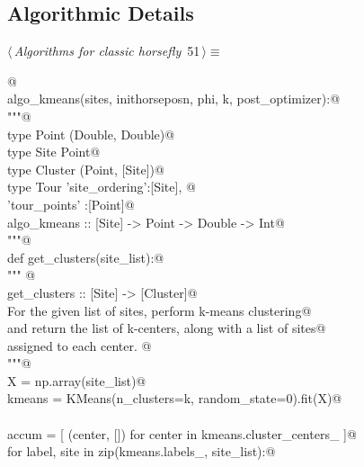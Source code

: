 \documentclass[11.5pt]{report}
\begin{document}
\subsection{Algorithmic Details}
\newchunk
\begin{flushleft} \small\label{scrap79}\raggedright\small
{} $\langle\,${\itshape Algorithms for classic horsefly}\nobreak\ {\footnotesize {51}}$\,\rangle\equiv$
\vspace{-1ex}
\begin{list}{}{} \item
\mbox{}\verb@   @\\
\mbox{}\verb@def algo_kmeans(sites, inithorseposn, phi, k, post_optimizer):@\\
\mbox{}\verb@     """@\\
\mbox{}\verb@     type Point   (Double, Double)@\\
\mbox{}\verb@     type Site    Point@\\
\mbox{}\verb@     type Cluster (Point, [Site])@\\
\mbox{}\verb@     type Tour    {'site_ordering':[Site], @\\
\mbox{}\verb@                   'tour_points'  :[Point]}@\\
\mbox{}\verb@     algo_kmeans :: [Site] -> Point -> Double -> Int@\\
\mbox{}\verb@     """@\\
\mbox{}\verb@     def get_clusters(site_list):@\\
\mbox{}\verb@           """ @\\
\mbox{}\verb@           get_clusters :: [Site] -> [Cluster]@\\
\mbox{}\verb@           For the given list of sites, perform k-means clustering@\\
\mbox{}\verb@           and return the list of k-centers, along with a list of sites@\\
\mbox{}\verb@           assigned to each center. @\\
\mbox{}\verb@           """@\\
\mbox{}\verb@           X      = np.array(site_list)@\\
\mbox{}\verb@           kmeans = KMeans(n_clusters=k, random_state=0).fit(X)@\\
\mbox{}\verb@@\\
\mbox{}\verb@           accum = [ (center, [])  for center in kmeans.cluster_centers_ ]@\\
\mbox{}\verb@           for label, site in zip(kmeans.labels_, site_list):@\\

\end{list}
\end{flushleft}
\end{document}
